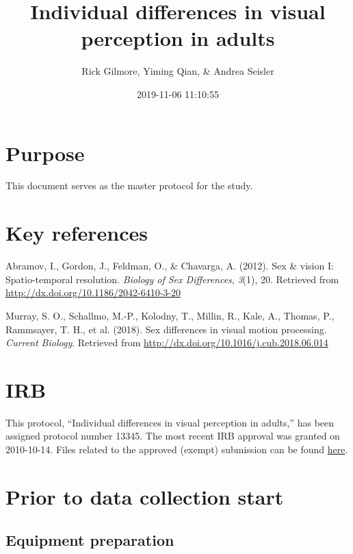 \documentclass[]{article}
\title{Individual differences in visual perception in adults}
\author{Rick Gilmore, Yiming Qian, \& Andrea Seisler}
\date{2019-11-06 11:10:55}
\begin{document}
\maketitle

{
\setcounter{tocdepth}{5}
\tableofcontents
}
\hypertarget{purpose}{%
\section{Purpose}\label{purpose}}

This document serves as the master protocol for the study.

\hypertarget{key-references}{%
\section{Key references}\label{key-references}}

Abramov, I., Gordon, J., Feldman, O., \& Chavarga, A. (2012). Sex \&
vision I: Spatio-temporal resolution. \emph{Biology of Sex Differences},
\emph{3}(1), 20. Retrieved from
\url{http://dx.doi.org/10.1186/2042-6410-3-20}

Murray, S. O., Schallmo, M.-P., Kolodny, T., Millin, R., Kale, A.,
Thomas, P., Rammsayer, T. H., et al. (2018). Sex differences in visual
motion processing. \emph{Current Biology}. Retrieved from
\url{http://dx.doi.org/10.1016/j.cub.2018.06.014}

\hypertarget{irb}{%
\section{IRB}\label{irb}}

This protocol, ``Individual differences in visual perception in
adults,'' has been assigned protocol number 13345. The most recent IRB
approval was granted on 2010-10-14. Files related to the approved
(exempt) submission can be found \href{../irb/2019-10-24}{here}.

\hypertarget{prior-to-data-collection-start}{%
\section{Prior to data collection
start}\label{prior-to-data-collection-start}}

\hypertarget{equipment-preparation}{%
\subsection{Equipment preparation}\label{equipment-preparation}}
\end{document}
